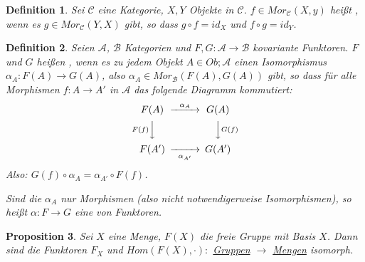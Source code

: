 \documentclass[a4paper,10pt,german]{scrbook}
\theoremstyle{saetze}
\theoremstyle{definitionen}
\newtheorem{Def}{Definition}[section]
\newtheorem{Prop}[Def]{Proposition}
\begin{document}
\begin{Def}
Sei $\mathcal C$ eine Kategorie, $X,Y$ Objekte in $\mathcal C$. $f\in Mor_{\mathcal C}(X,y)$ heißt , wenn es $g\in Mor_{\mathcal C}(Y,X)$ gibt, so dass $g \circ f = id_X$ und $f \circ g = id_Y$.
\end{Def}

\begin{Def}
Seien $\mathcal A$, $\mathcal B$ Kategorien und $F,G:\mathcal A \to \mathcal B$ kovariante Funktoren. $F$ und $G$ heißen , wenn es zu jedem Objekt $A\in Ob;\mathcal A$ einen Isomorphismus $\alpha_A: F(A) \to G(A)$, also $\alpha_A\in Mor_{\mathcal B}(F(A),G(A))$ gibt, so dass für alle Morphismen $f:A \to A'$ in $\mathcal A$ das folgende Diagramm kommutiert:
\[
\begin{CD}
F(A) @>\alpha_A>> G(A) \\
@VF(f)VV         @VVG(f)V \\
F(A') @>>\alpha_{A'}> G(A') 
\end{CD}
\]
Also: $G(f)\circ \alpha_A = \alpha_{A'} \circ F(f)$.

Sind die $\alpha_A$ nur Morphismen (also nicht notwendigerweise Isomorphismen), so heißt $\alpha: F\to G$ eine  von Funktoren.
\label{funktorisomorphismus}
\end{Def}

\begin{Prop}
Sei $X$ eine Menge, $F(X)$ die freie Gruppe mit Basis $X$. Dann sind die Funktoren $F_X$ und $Hom(F(X),\cdot):$ \underline{Gruppen} $\to$ \underline{Mengen} isomorph.
\end{Prop}

\end{document}
